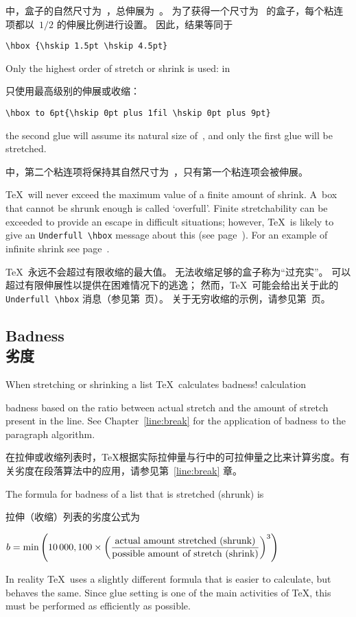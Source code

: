 中，盒子的自然尺寸为~\n{0pt}，总伸展为~\n{12pt}。
为了获得一个尺寸为~\n{6pt} 的盒子，每个粘连项都以~$1/2$ 的伸展比例进行设置。
因此，结果等同于
\begin{verbatim}
\hbox {\hskip 1.5pt \hskip 4.5pt}
\end{verbatim}
Only the highest order of stretch or shrink is used:
in 

只使用最高级别的伸展或收缩：\begin{verbatim}
\hbox to 6pt{\hskip 0pt plus 1fil \hskip 0pt plus 9pt}
\end{verbatim}
the second glue  will assume its natural size of~\n{0pt},
and only the first   glue will be stretched.

中，第二个粘连项将保持其自然尺寸为~\n{0pt}，只有第一个粘连项会被伸展。

\TeX\ will never exceed the maximum value of a finite
amount of shrink.
A~box that cannot be shrunk enough is called `overfull'.
Finite stretchability can be exceeded to provide an
escape in difficult situations; however, \TeX\ is likely 
to give an \verb-Underfull \hbox- message about this
(see page~\pageref{over/underfull}).
For an example of infinite shrink see page~\pageref{rlap}.

\TeX\ 永远不会超过有限收缩的最大值。
无法收缩足够的盒子称为“过充实”。
可以超过有限伸展性以提供在困难情况下的逃逸；
然而，\TeX\ 可能会给出关于此的 \verb-Underfull \hbox- 消息（参见第~\pageref{over/underfull}页）。
关于无穷收缩的示例，请参见第\pageref{rlap}~页。

\subsection{Badness\\劣度}

When stretching or shrinking a list \TeX\ calculates 
\term badness! calculation\par
badness based on the
ratio between actual stretch and the amount of stretch
present in the line. See Chapter~\ref{line:break}
for the application  of badness to the paragraph algorithm.

在拉伸或收缩列表时，\TeX 根据实际拉伸量与行中的可拉伸量之比来计算劣度。有关劣度在段落算法中的应用，请参见第~\ref{line:break} 章。

The formula for badness of a list that is stretched (shrunk) is
\label{bad:form}

拉伸（收缩）列表的劣度公式为
\begin{disp} $\displaystyle b=\hbox{min}\left(10\,000,
100\times \left({\hbox{actual amount stretched (shrunk)}
\over\hbox{possible amount of stretch (shrink)}}\right)^3\right)$\end{disp}
In reality \TeX\ uses a slightly different formula that is
easier to calculate, but behaves the same. Since glue setting is
one of the main activities of \TeX, this must be performed
as efficiently as possible.

